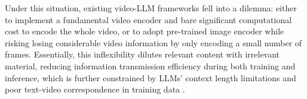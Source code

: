 Under this situation, existing video-LLM frameworks fell into a dilemma: either to implement a fundamental video encoder and bare significant computational cost to encode the whole video, or to adopt pre-trained image encoder while risking losing considerable video information by only encoding a small number of frames.
Essentially, this inflexibility dilutes relevant content with irrelevant material, reducing information transmission efficiency during both training and inference, which is further constrained by LLMs' context length limitations and poor text-video correspondence in training data \citep{lin2024norton}. 

